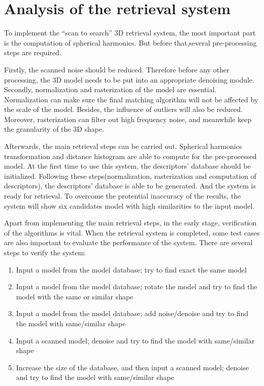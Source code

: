 \section{Analysis of the retrieval system}

To implement the ``scan to search'' 3D retrieval system, the most important part is the computation of spherical harmonics. But before that,several pre-processing steps are required. 

Firstly, the scanned noise should be reduced. Therefore before any other processing, the 3D model needs to be put into an appropriate denoising module. Secondly, normalization and rasterization of the model are essential. Normalization can make sure the final matching algorithm will not be affected by the scale of the model. Besides, the influence of outliers will also be reduced. Moreover, rasterization can filter out high frequency noise, and meanwhile keep the granularity of the 3D shape. 

Afterwards, the main retrieval steps can be carried out. Spherical harmonics transformation and distance histogram are able to compute for the pre-processed model. At the first time to use this system, the descriptors' database should be initialized. Following these steps(normalization, rasterization and computation of descriptors), the descriptors' database is able to be generated. And the system is ready for retrieval. To overcome the protential inaccuracy of the results, the system will show six candidates model with high similarities to the input model.

Apart from implementing the main retrieval steps, in the early stage, verification of the algorithms is vital. When the retrieval system is completed, some test cases are also important to evaluate the performance of the system. There are several steps to verify the system: 

\begin{enumerate}[1)]
\item Input a model from the model database; try to find exact the same model
\item Input a model from the model database; rotate the model and try to find the model with the same or similar shape
\item Input a model from the model database; add noise/denoise and try to find the model with same/similar shape
\item Input a scanned model; denoise and try to find the model with same/similar shape
\item Increase the size of the database, and then input a scanned model; denoise and try to find the model with same/similar shape
\end{enumerate}

